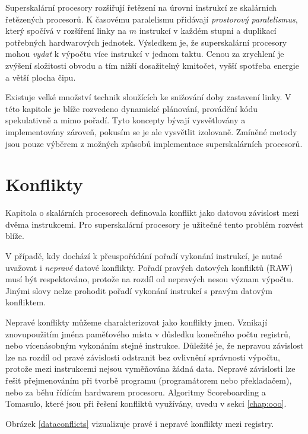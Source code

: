 Superskalární procesory rozšiřují řetězení na úrovni instrukcí ze skalárních řetězených procesorů.
K časovému paralelismu přidávají \emph{prostorový paralelismus}, který spočívá v rozšíření linky na $m$ instrukcí v každém stupni a duplikací potřebných hardwarových jednotek.
Výsledkem je, že superskalární procesory mohou \emph{vydat} k výpočtu více instrukcí v jednom taktu.
Cenou za zrychlení je zvýšení složitosti obvodu a tím nižší dosažitelný kmitočet, vyšší spotřeba energie a větší plocha čipu.

Existuje velké množství technik sloužících ke snižování doby zastavení linky.
V této kapitole je blíže rozvedeno dynamické plánování, provádění kódu spekulativně a mimo pořadí.
Tyto koncepty bývají vysvětlovány a implementovány zároveň, pokusím se je ale vysvětlit izolovaně.
Zmíněné metody jsou pouze výběrem z možných způsobů implementace superskalárních procesorů.


\section{Konflikty}
\label{conflicts}

Kapitola o skalárních procesorech definovala konflikt jako datovou závislost mezi dvěma instrukcemi.
Pro superskalární procesory je užitečné tento problém rozvést blíže.

V případě, kdy dochází k přeuspořádání pořadí vykonání instrukcí, je nutné uvažovat i \emph{nepravé} datové konflikty.
Pořadí pravých datových konfliktů (RAW) musí být respektováno, protože na rozdíl od nepravých nesou význam výpočtu. Jinými slovy nelze prohodit pořadí vykonání instrukcí s pravým datovým konfliktem.

Nepravé konflikty můžeme charakterizovat jako konflikty jmen.
Vznikají znovupoužitím jména paměťového místa v důsledku konečného počtu registrů, nebo vícenásobným vykonáním stejné instrukce.
Důležité je, že nepravou závislost lze na rozdíl od pravé závislosti odstranit bez ovlivnění správnosti výpočtu, protože mezi instrukcemi nejsou vyměňována žádná data.
Nepravé závislosti lze řešit přejmenováním při tvorbě programu (programátorem nebo překladačem), nebo za běhu řídícím hardwarem procesoru.
Algoritmy Scoreboarding a Tomasulo, které jsou při řešení konfliktů využívány, uvedu v sekci \ref{chap:ooo}.

Obrázek \ref{dataconflicts} vizualizuje pravé i nepravé konflikty mezi registry.

